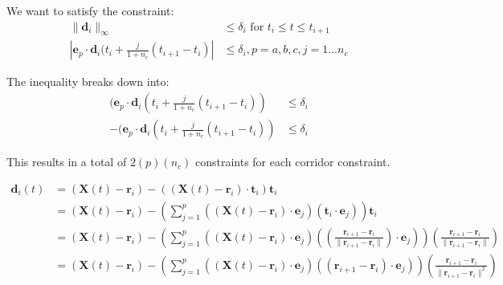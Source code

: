 \documentclass[11pt]{article}
\begin{document}
We want to satisfy the constraint:
\begin{align*}
\| \mathbf{d}_i \|_{\infty} & \le \delta_i \text{ for } t_i \le t \le t_{i+1} \\
| \mathbf{e}_p \cdot \mathbf{d}_i (t_i + \frac{j}{1+n_c} (t_{i+1} - t_i) | & \le \delta_i ,  p = a, b, c, j = 1 ... n_c 
\end{align*}

The inequality breaks down into: 
\begin{align*}
(\mathbf{e}_p \cdot \mathbf{d}_i (t_i + \frac{j}{1+n_c} (t_{i+1} - t_i) ) & \le \delta_i \\
- (\mathbf{e}_p \cdot \mathbf{d}_i (t_i + \frac{j}{1+n_c} (t_{i+1} - t_i) ) & \le \delta_i 
\end{align*}

This results in a total of $2(p)(n_c)$ constraints for each corridor constraint. 

\begin{align*}
\mathbf{d}_i (t) &= (\mathbf{X}(t) - \mathbf{r}_i) - ((\mathbf{X}(t) - \mathbf{r}_i) \cdot \mathbf{t}_i) \mathbf{t}_i \\
&= (\mathbf{X}(t) - \mathbf{r}_i) - \left( \sum_{j = 1}^{p} {((\mathbf{X}(t) - \mathbf{r}_i) \cdot \mathbf{e}_j)(\mathbf{t}_i \cdot \mathbf{e}_j)} \right) \mathbf{t}_i \\ 
&= (\mathbf{X}(t) - \mathbf{r}_i) - \left( \sum_{j = 1}^{p}  {((\mathbf{X}(t) - \mathbf{r}_i) \cdot \mathbf{e}_j)((\frac{ \mathbf{r}_{i+1} - \mathbf{r}_i } { \| \mathbf{r}_{i+1} - \mathbf{r}_i \| }) \cdot \mathbf{e}_j)} \right) (\frac{ \mathbf{r}_{i+1} - \mathbf{r}_i } { \| \mathbf{r}_{i+1} - \mathbf{r}_i \| }) \\ 
&= (\mathbf{X}(t) - \mathbf{r}_i) - \left( \sum_{j = 1}^{p}  {((\mathbf{X}(t) - \mathbf{r}_i) \cdot \mathbf{e}_j)(( \mathbf{r}_{i+1} - \mathbf{r}_i ) \cdot \mathbf{e}_j)} \right) (\frac{ \mathbf{r}_{i+1} - \mathbf{r}_i } { \| \mathbf{r}_{i+1} - \mathbf{r}_i \|^2 }) \\ 
\end{align*}
\end{document}
